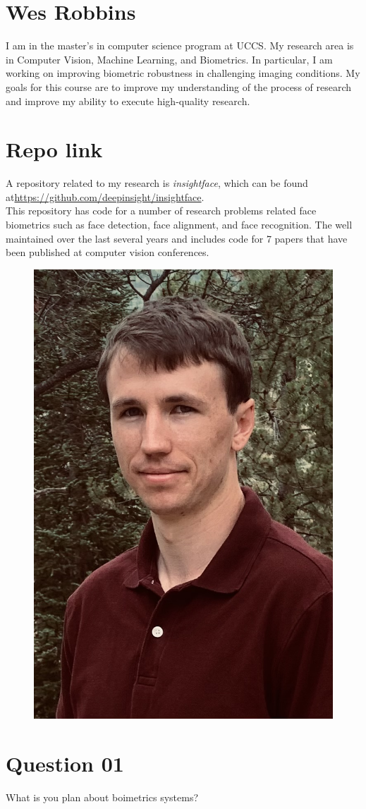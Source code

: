 \section{Wes Robbins}
I am in the master's in computer science program at UCCS. My research area is in Computer Vision, Machine Learning, and Biometrics. In particular, I am working on improving biometric robustness in challenging imaging conditions. My goals for this course are to improve my understanding of the process of research and improve my ability to execute high-quality research. 

\section{Repo link}
A repository related to my research is \textit{insightface},
which can be found at\newline \url{https://github.com/deepinsight/insightface}. \\
This repository has code for a number of research problems related face biometrics such as face detection, face alignment, and face recognition. The well maintained over the last several years and includes code for 7 papers that have been published at computer vision conferences.


\begin{figure}[h]
    \centering
    \includegraphics[width=.25\textwidth]{robbins.jpg}
\end{figure}

\section{Question 01}
What is you plan about boimetrics systems?
